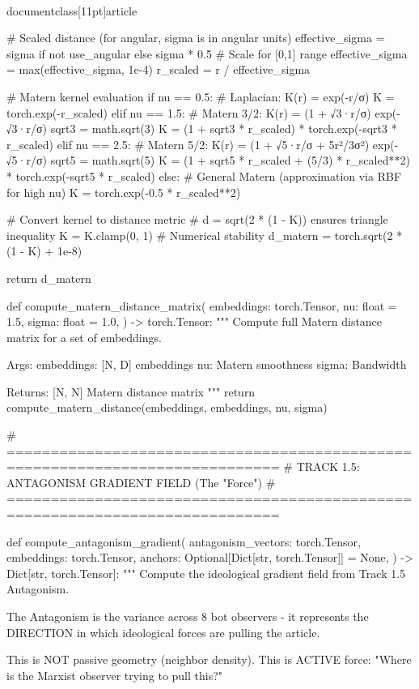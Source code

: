\\documentclass[11pt]{article}
\begin{document}
\begin{CodeBlock}
    # Scaled distance (for angular, sigma is in angular units)
    effective_sigma = sigma if not use_angular else sigma * 0.5  # Scale for [0,1] range
    effective_sigma = max(effective_sigma, 1e-4)
    r_scaled = r / effective_sigma

    # Matern kernel evaluation
    if nu == 0.5:
        # Laplacian: K(r) = exp(-r/σ)
        K = torch.exp(-r_scaled)
    elif nu == 1.5:
        # Matern 3/2: K(r) = (1 + √3·r/σ) exp(-√3·r/σ)
        sqrt3 = math.sqrt(3)
        K = (1 + sqrt3 * r_scaled) * torch.exp(-sqrt3 * r_scaled)
    elif nu == 2.5:
        # Matern 5/2: K(r) = (1 + √5·r/σ + 5r²/3σ²) exp(-√5·r/σ)
        sqrt5 = math.sqrt(5)
        K = (1 + sqrt5 * r_scaled + (5/3) * r_scaled**2) * torch.exp(-sqrt5 * r_scaled)
    else:
        # General Matern (approximation via RBF for high nu)
        K = torch.exp(-0.5 * r_scaled**2)

    # Convert kernel to distance metric
    # d = sqrt(2 * (1 - K)) ensures triangle inequality
    K = K.clamp(0, 1)  # Numerical stability
    d_matern = torch.sqrt(2 * (1 - K) + 1e-8)

    return d_matern


def compute_matern_distance_matrix(
    embeddings: torch.Tensor,
    nu: float = 1.5,
    sigma: float = 1.0,
) -> torch.Tensor:
    """
    Compute full Matern distance matrix for a set of embeddings.

    Args:
        embeddings: [N, D] embeddings
        nu: Matern smoothness
        sigma: Bandwidth

    Returns:
        [N, N] Matern distance matrix
    """
    return compute_matern_distance(embeddings, embeddings, nu, sigma)


# =============================================================================
# TRACK 1.5: ANTAGONISM GRADIENT FIELD (The "Force")
# =============================================================================

def compute_antagonism_gradient(
    antagonism_vectors: torch.Tensor,
    embeddings: torch.Tensor,
    anchors: Optional[Dict[str, torch.Tensor]] = None,
) -> Dict[str, torch.Tensor]:
    """
    Compute the ideological gradient field from Track 1.5 Antagonism.

    The Antagonism is the variance across 8 bot observers - it represents
    the DIRECTION in which ideological forces are pulling the article.

    This is NOT passive geometry (neighbor density).
    This is ACTIVE force: "Where is the Marxist observer trying to pull this?"


\end{CodeBlock}
\end{document}

